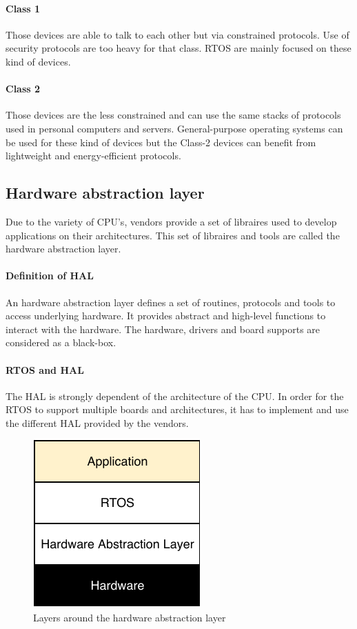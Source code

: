 \paragraph{Class 1}
Those devices are able to talk to each other but via constrained protocols.
Use of security protocols are too heavy for that class.
RTOS are mainly focused on these kind of devices.

\paragraph{Class 2}
Those devices are the less constrained and can use the same stacks of protocols used in personal computers and servers.
General-purpose operating systems can be used for these kind of devices but the Class-2 devices can benefit from lightweight and energy-efficient protocols.

\subsection{Hardware abstraction layer}

Due to the variety of CPU's, vendors provide a set of libraires used to develop applications on their architectures.
This set of libraires and tools are called the hardware abstraction layer.

\paragraph{Definition of HAL}
An hardware abstraction layer defines a set of routines, protocols and tools to access underlying hardware.
It provides abstract and high-level functions to interact with the hardware.
The hardware, drivers and board supports are considered as a black-box.

\paragraph{RTOS and HAL}
The HAL is strongly dependent of the architecture of the CPU.
In order for the RTOS to support multiple boards and architectures, it has to implement and use the different HAL provided by the vendors.

\begin{figure}[!h]
  \centering
  \includegraphics[scale=1]{assets/hal-layers.pdf}
  \caption{\label{fig:hal-layer}Layers around the hardware abstraction layer}
\end{figure}

